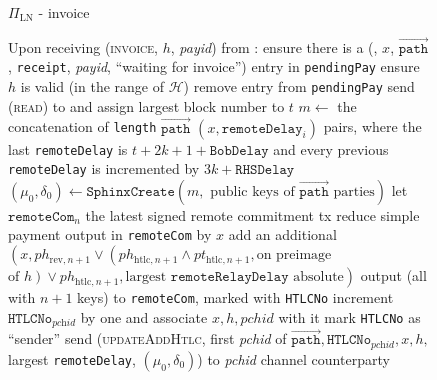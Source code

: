 \begin{figure}[H]
\begin{protocolbox}{$\Pi_{\mathrm{LN}}$ - invoice}
\begin{algorithmic}[1]
        \State Upon receiving (\textsc{invoice}, $h$, \textit{payid}) from \bob:
        \Indent
          \State ensure there is a (\bob, $x$, $\overrightarrow{\mathtt{path}}$,
          \texttt{receipt}, \textit{payid}, ``waiting for invoice'') entry in
          \texttt{pendingPay}
          \State ensure $h$ is valid (in the range of $\mathcal{H}$)
          \State remove entry from \texttt{pendingPay}
          \State send (\textsc{read}) to \ledger{} and assign largest block
          number to $t$
          \State $m \gets$ the concatenation of \texttt{length}
          $\overrightarrow{\mathtt{path}}$ $\left(x,
          \mathtt{remoteDelay}_i\right)$ pairs, where the last
          \texttt{remoteDelay} is $t + 2k + 1 + \mathtt{BobDelay}$ and every
          previous \texttt{remoteDelay} is incremented by $3k +
          \mathtt{RHSDelay}$ 
          \State $\left(\mu_0, \delta_0\right) \gets
          \mathtt{SphinxCreate}\left(m, \text{ public keys of }
          \overrightarrow{\mathtt{path}} \text{ parties}\right)$
          \State let $\mathtt{remoteCom}_n$ the latest signed remote commitment
          tx
          \State reduce simple payment output in \texttt{remoteCom} by $x$
          \State add an additional $\left(x, ph_{\mathrm{rev}, n+1} \vee
          \left(ph_{\mathrm{htlc}, n+1} \wedge pt_{\mathrm{htlc}, n+1}, \text{
          on preimage}\right.\right.$ $\left.\left.\text{of } h\right) \vee
          ph_{\mathrm{htlc}, n+1}, \text{largest } \mathtt{remoteRelayDelay}
          \text{ absolute}\right)$ output (all with $n+1$ keys) to
          \texttt{remoteCom}, marked with \texttt{HTLCNo}
          \State increment $\mathtt{HTLCNo}_{\textit{pchid}}$ by one and
          associate $x, h, \mathit{pchid}$ with it
          \State mark \texttt{HTLCNo} as ``sender''
          \State send (\textsc{updateAddHtlc}, first \textit{pchid} of
          $\overrightarrow{\mathtt{path}}, \mathtt{HTLCNo}_{\textit{pchid}}, x,
          h,$ largest \texttt{remoteDelay}, $\left(\mu_0, \delta_0\right)$) to
          \textit{pchid} channel counterparty
        \EndIndent
      \end{algorithmic}
    \end{protocolbox}
    \caption{}
    \label{alg:protocol:pay:invoice}
  \end{figure}

